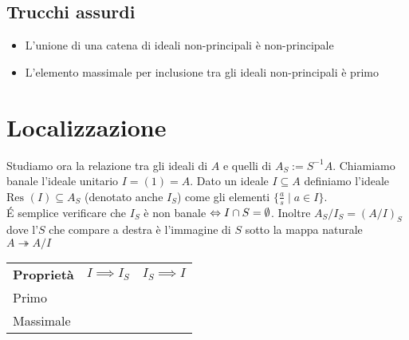 \documentclass[a4paper,GeneralMath,NoNotes]{stdmdoc}
\newcommand{\Res}{\text{Res }}
\newcommand{\rarr}{\twoheadrightarrow}
\begin{document}
	\subsection{Trucchi assurdi}
	\begin{itemize}
		\item L'unione di una catena di ideali non-principali è non-principale
		\item L'elemento massimale per inclusione tra gli ideali non-principali è primo
	\end{itemize}

	\section*{Localizzazione}
	Studiamo ora la relazione tra gli ideali di $A$ e quelli di $A_S := S^{-1}A$. Chiamiamo banale l'ideale unitario $I = (1) = A$. Dato un ideale $I \subseteq A$ definiamo l'ideale $\Res (I) \subseteq A_S$ (denotato anche $I_S$) come gli elementi $\{ \frac{a}{s} \mid a \in I \}$. \\

	\'E semplice verificare che $I_S$ è non banale $\Leftrightarrow I \cap S = \emptyset$. Inoltre $A_S / I_S = (A/I)_S$ dove l'$S$ che compare a destra è l'immagine di $S$ sotto la mappa naturale $A \rarr A/I$

	\vskip 0.3cm \begin{tabular}{lcc}
	{\bf Proprietà} & {\bf $I \implies I_S$} & {\bf $I_S \implies I$} \\
	Primo           & \checkmark             & \checkmark             \\
	Massimale       & \checkmark             & \crossmark             \\
	\end{tabular} \vskip 0.3cm	
\end{document}
